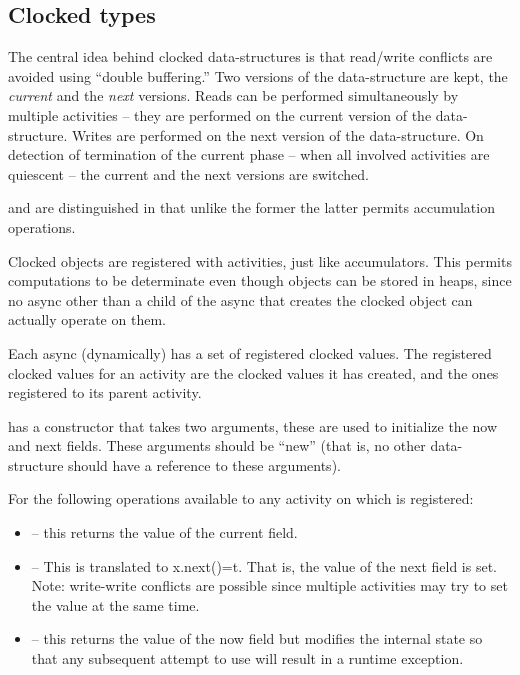 \subsection{Clocked types}

The central idea behind clocked data-structures is that read/write
conflicts are avoided using ``double buffering.'' Two versions of the
data-structure are kept, the {\em current} and the {\em next}
versions. Reads can be performed simultaneously by multiple activities
-- they are performed on the current version of the
data-structure. Writes are performed on the next version of the
data-structure. On detection of termination of the current phase --
when all involved activities are quiescent -- the current and the next
versions are switched.

 and  are distinguished in that
unlike the former the latter permits accumulation operations.

Clocked objects are registered with activities, just like
accumulators.  This permits computations to be determinate even though
objects can be stored in heaps, since no async other than a child of
the async that creates the clocked object can actually operate on
them.

Each async (dynamically) has a set of registered clocked values. The
registered clocked values for an activity are the clocked values it
has created, and the ones registered to its parent activity.

  has a constructor that takes two  arguments, these are
used to initialize the now and next fields. These arguments should be
``new'' (that is, no other data-structure should have a reference to
these arguments).

For  the following operations available to any activity on which 
is registered:
\begin{itemize}
\item {} -- this returns the value of the current field.

\item {} -- This is translated to x.next()=t. That is, the
  value of the next field is set. Note:
     write-write conflicts are possible since multiple activities may
     try to set the value at the same time.
\item{} -- this returns the value of the now field
  but modifies the internal state so that any subsequent attempt to
  use  will result in a runtime exception.
\end{itemize}

